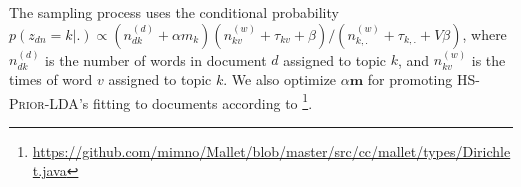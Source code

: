 \documentclass[runningheads,a4paper]{llncs}
\begin{document}
The sampling process uses the conditional probability \(p(z_{dn}=k|.)\propto (n^{(d)}_{dk}+\alpha m_k)(n^{(w)}_{kv}+\tau_{kv}+\beta)/(n^{(w)}_{k,.}+\tau_{k,.}+V\beta)\), where \(n^{(d)}_{dk}\) is the number of words in document \(d\) assigned to topic \(k\), and \(n^{(w)}_{kv}\) is the times of word \(v\) assigned to topic \(k\).
We also optimize \(\alpha \bm{m}\) for promoting \textsc{HS-Prior-LDA}'s fitting to documents according to \cite{wallach2008structured}\footnote{\url{https://github.com/mimno/Mallet/blob/master/src/cc/mallet/types/Dirichlet.java}}.

\end{document}
